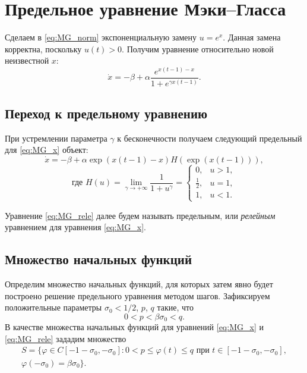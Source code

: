 \section{Предельное уравнение Мэки--Гласса}\label{sec:ch1/sec1}

Сделаем в \eqref{eq:MG_norm} экспоненциальную замену $u=e^x$. Данная замена корректна, поскольку $u(t) > 0$. Получим уравнение относительно новой неизвестной $x$:
\begin{equation}
	\label{eq:MG_x}
	\dot{x}=-\beta+\alpha\frac{e^{x(t-1)-x}}{1+e^{\gamma x(t-1)}}.
\end{equation}

\subsection{Переход к предельному уравнению}

При устремлении параметра $\gamma$ к бесконечности получаем следующий предельный для \eqref{eq:MG_x} объект:
\begin{equation}
    \label{eq:MG_rele}
    \dot{x}=-\beta + \alpha \exp({x(t-1)-x})H(\exp({x(t-1)})),
\end{equation}
%
\begin{equation}
    \label{eq:H}
    \text{где }
    H(u)=\lim\limits_{\gamma\to +\infty}\frac{1}{1+u^{\gamma}}=
    \begin{cases}
        0, & u > 1,\\
        \frac{1}{2}, & u = 1,\\
        1, & u < 1.
    \end{cases}
\end{equation}

Уравнение \eqref{eq:MG_rele} далее будем называть предельным, или \emph{релейным} уравнением для уравнения \eqref{eq:MG_x}.

\subsection{Множество начальных функций}

Определим множество начальных функций, для которых затем явно будет построено решение предельного уравнения методом шагов. Зафиксируем положительные параметры $\sigma_0 < 1/2$, $p$, $q$ такие, что 
%
\[0 < p < \beta \sigma_0 < q.\]
%
В качестве множества начальных функций для уравнений \eqref{eq:MG_x} и \eqref{eq:MG_rele} зададим множество
\begin{multline}
    \label{eq:init_set}
    S=\{\varphi\in C[-1 - \sigma_0, -\sigma_0]: 0 < p \leqslant \varphi(t)\leqslant q \text{ при } t \in [-1 - \sigma_0, -\sigma_0],\\ \varphi(-\sigma_0) = \beta \sigma_0 \}.
\end{multline}

